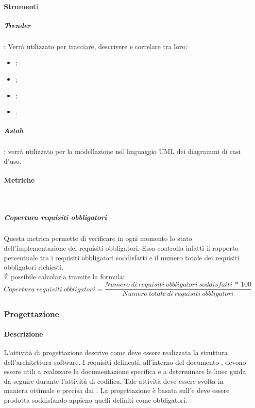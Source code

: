\documentclass[../NormeDiProgetto_v4.0.0.tex]{subfiles}
\begin{document}
			\paragraph{Strumenti}
				\subparagraph{Trender}: Verrà utilizzato per tracciare, descrivere e correlare tra loro:
					\begin{itemize}
						\item {};
						\item {};
						\item {};
						\item {}.
					\end{itemize}
				\subparagraph{Astah}: verrà utilizzato per la modellazione nel linguaggio UML dei diagrammi di casi d'uso.

			\paragraph{Metriche}\mbox{}\\
				\subparagraph{Copertura requisiti obbligatori}
					Questa metrica permette di verificare in ogni momento lo stato dell'implementazione dei requisiti obbligatori. Essa controlla infatti il rapporto percentuale tra i requisiti obbligatori soddisfatti e il numero totale dei requisiti obbligatori richiesti.\\
					É possibile calcolarla tramite la formula:
					\begin{equation*}
						Copertura \ requisiti \ obbligatori = \frac{Numero \ di \ requisiti \ obbligatori \ soddisfatti \ * \ 100}{Numero \ totale \ di \ requisiti \ obbligatori}
					\end{equation*}

	\subsubsection{Progettazione}
		\paragraph{Descrizione}
		L'attività di progettazione descrive come deve essere realizzata la struttura dell'architettura software. I requisiti delineati, all'interno del documento \analisideirequisiti, devono essere utili a realizzare la documentazione specifica e a determinare le linee guida da seguire durante l'attività di codifica. Tale attività deve essere svolta in maniera ottimale e precisa dai \progettisti.
		La progettazione è basata sull'\analisideirequisiti e deve essere prodotta soddisfando appieno quelli definiti come obbligatori.
		
\end{document}

